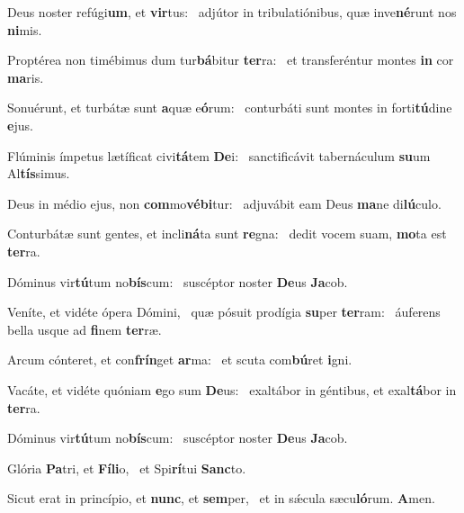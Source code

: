 \item Deus noster refúgi\textbf{um}, et \textbf{vir}tus:~\psstar{} adjútor in tribulatiónibus, quæ inve\textbf{né}runt nos \textbf{ni}mis.
\item Proptérea non timébimus dum tur\textbf{bá}bitur \textbf{ter}ra:~\psstar{} et transferéntur montes \textbf{in} cor \textbf{ma}ris.
\item Sonuérunt, et turbátæ sunt \textbf{a}quæ e\textbf{ó}rum:~\psstar{} conturbáti sunt montes in forti\textbf{tú}dine \textbf{e}jus.
\item Flúminis ímpetus lætíficat civi\textbf{tá}tem \textbf{De}i:~\psstar{} sanctificávit tabernáculum \textbf{su}um Al\textbf{tís}simus.
\item Deus in médio ejus, non \textbf{com}mo\textbf{vé}\textbf{bi}tur:~\psstar{} adjuvábit eam Deus \textbf{ma}ne di\textbf{lú}culo.
\item Conturbátæ sunt gentes, et incli\textbf{ná}ta sunt \textbf{re}gna:~\psstar{} dedit vocem suam, \textbf{mo}ta est \textbf{ter}ra.
\item Dóminus vir\textbf{tú}tum no\textbf{bís}\-cum:~\psstar{} suscéptor noster \textbf{De}us \textbf{Ja}cob.
\item Veníte, et vidéte ópera Dómini,~\pscross{} quæ pósuit prodígia \textbf{su}per \textbf{ter}ram:~\psstar{} áuferens bella usque ad \textbf{fi}nem \textbf{ter}ræ.
\item Arcum cónteret, et con\textbf{frín}get \textbf{ar}ma:~\psstar{} et scuta com\textbf{bú}ret \textbf{i}gni.
\item Vacáte, et vidéte quóniam \textbf{e}go sum \textbf{De}us:~\psstar{} exaltábor in géntibus, et exal\textbf{tá}bor in \textbf{ter}ra.
\item Dóminus vir\textbf{tú}tum no\textbf{bís}\-cum:~\psstar{} suscéptor noster \textbf{De}us \textbf{Ja}cob.
\item Glória \textbf{Pa}tri, et \textbf{Fí}\textbf{li}o,~\psstar{} et Spi\textbf{rí}tui \textbf{Sanc}to.
\item Sicut erat in princípio, et \textbf{nunc}, et \textbf{sem}per,~\psstar{} et in sǽcula sæcu\textbf{ló}rum. \textbf{A}men.